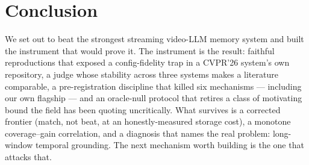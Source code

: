 \section{Conclusion}
\label{sec:conclusion}

We set out to beat the strongest streaming video-LLM memory system and built the instrument that would prove it. The instrument is the result: faithful reproductions that exposed a config-fidelity trap in a CVPR'26 system's own repository, a judge whose stability across three systems makes a literature comparable, a pre-registration discipline that killed six mechanisms — including our own flagship — and an oracle-null protocol that retires a class of motivating bound the field has been quoting uncritically. What survives is a corrected frontier (match, not beat, at an honestly-measured storage cost), a monotone coverage--gain correlation, and a diagnosis that names the real problem: long-window temporal grounding. The next mechanism worth building is the one that attacks that.
